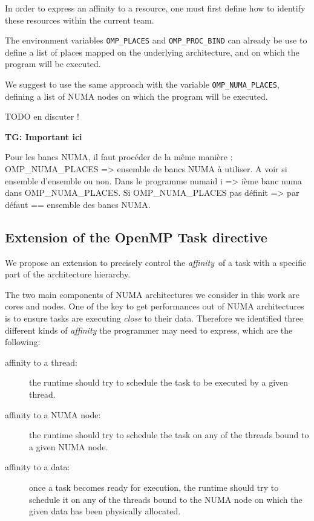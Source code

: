 \documentclass{Styles/llncs}
\newcommand{\TG}[1]{{\color{red}\bfseries TG: #1}}
\begin{document}
In order to express an affinity to a resource, one must first define how to identify these
resources within the current team.

The environment variables \verb/OMP_PLACES/ and \verb/OMP_PROC_BIND/ can already
be use to define a list of places mapped on the underlying architecture, and on which the program will be executed.

We suggest to use the same approach with the variable \verb/OMP_NUMA_PLACES/,
defining a list of NUMA nodes on which the program will be executed.

TODO en discuter !

\TG{Important ici}

Pour les bancs NUMA, il faut procéder de la même manière : 
OMP\_NUMA\_PLACES => ensemble de bancs NUMA à utiliser. A voir si ensemble d'ensemble ou non.
Dans le programme numaid i => ième banc numa dans OMP\_NUMA\_PLACES.
Si OMP\_NUMA\_PLACES pas définit => par défaut == ensemble des bancs NUMA.

\subsection{Extension of the OpenMP Task directive}

We propose an extension to precisely control the \emph{affinity} of a task with a specific part of the architecture hierarchy.

The two main components of NUMA architectures we consider in this work are cores and nodes. One of
the key to get performances out of NUMA architectures is to ensure tasks are
executing \emph{close} to their data.
Therefore we identified three different kinds of \emph{affinity} the programmer
may need to express, which are the following:
\begin{description}
    \item [affinity to a thread:]
      the runtime should try to schedule the task to be executed by a given thread.

    \item [affinity to a NUMA node:]
      the runtime should try to schedule the task on any of the threads bound to
      a given NUMA node.

    \item [affinity to a data:]
      once a task becomes ready for execution, the runtime should try to schedule it on any of the threads bound to the NUMA node on which the given data has been physically allocated.
\end{description}
\end{document}
